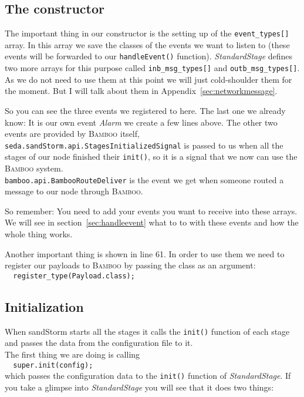\documentclass[twocolumn, twoside, a4paper]{article}
\begin{document}
\subsection{The constructor}
\label{sec:constructor}

The important thing in our constructor is the setting up of the
\texttt{event\_types[]} array. In this array we save the classes of the
events we want to listen to (these events will be forwarded to our
\texttt{handleEvent()} function). \emph{StandardStage} defines two
more arrays for this purpose called \texttt{inb\_msg\_types[]} and
\texttt{outb\_msg\_types[]}. As we do not need to use them at this
point we will just cold-shoulder them for the moment. But I will talk
about them in Appendix~\ref{sec:networkmessage}.

So you can see the three events we registered to here. The last one we
already know: It is our own event \emph{Alarm} we create a few lines
above. The other two events are provided by \textsc{Bamboo} itself,
\texttt{seda.sandStorm.api.StagesInitializedSignal} is passed to us
when all the stages of our node finished their \texttt{init()}, so it
is a signal that we now can use the \textsc{Bamboo} system.\\
\texttt{bamboo.api.BambooRouteDeliver} is the event we get when
someone routed a message to our node through \textsc{Bamboo}.

So remember: You need to add your events you want to receive into these
arrays. We will see in section~\ref{sec:handleevent} what to to with these
events and how the whole thing works.

Another important thing is shown in line 61. In order to use them we
need to register our payloads to \textsc{Bamboo} by passing the class as an
argument:\\
\lstinline$  register_type(Payload.class);$


\subsection{Initialization}
\label{sec:init}

When sandStorm starts all the stages it calls the \texttt{init()}
function of each stage and passes the data from the configuration file
to it.\\
The first thing we are doing is calling\\
\lstinline$  super.init(config);$ \\
which passes the configuration data to the \texttt{init()} function of
\emph{StandardStage}. If you take a glimpse into \emph{StandardStage}
you will see that it does two things:
\end{document}
